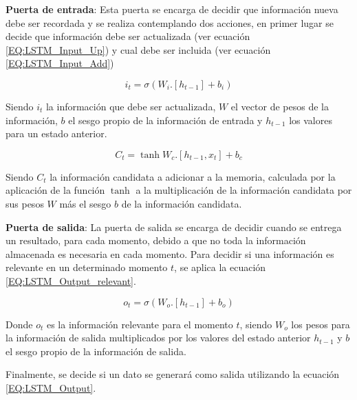            \textbf{Puerta de entrada}: Esta puerta se encarga de decidir que información nueva debe ser recordada y se realiza contemplando dos acciones, en primer lugar se decide que información debe ser actualizada (ver ecuación \ref{EQ:LSTM_Input_Up}) y cual debe ser incluida (ver ecuación \ref{EQ:LSTM_Input_Add})
            
            \begin{equation}
                \label{EQ:LSTM_Input_Up}
                i_t = \sigma(W_i . [h_{t-1}] + b_i)
            \end{equation}
            
            Siendo $i_t$ la información que debe ser actualizada, $W$ el vector de pesos de la información, $b$ el sesgo propio de la información de entrada y $h_{t-1}$ los valores para un estado anterior.
            
            \begin{equation}
                \label{EQ:LSTM_Input_Add}
                C_t = \tanh{W_c . [h_{t-1}, x_t] + b_c}
            \end{equation}
            
            Siendo $C_t$ la información candidata a adicionar a la memoria, calculada por la aplicación de la función $\tanh$ a la multiplicación de la información candidata por sus pesos $W$ más el sesgo $b$ de la información candidata.
            
            \textbf{Puerta de salida}: La puerta de salida se encarga de decidir cuando se entrega un resultado, para cada momento, debido a que no toda la información almacenada es necesaria en cada momento. Para decidir si una información es relevante en un determinado momento $t$, se aplica la ecuación \ref{EQ:LSTM_Output_relevant}.
            
            \begin{equation}
                \label{EQ:LSTM_Output_relevant}
                o_t = \sigma(W_o . [h_{t-1}] + b_o)
            \end{equation}
            
            Donde $o_t$ es la información relevante para el momento $t$, siendo $W_o$ los pesos para la información de salida multiplicados por los valores del estado anterior $h_{t-1}$ y $b$ el sesgo propio de la información de salida.
            
            Finalmente, se decide si un dato se generará como salida utilizando la ecuación \ref{EQ:LSTM_Output}.
            
